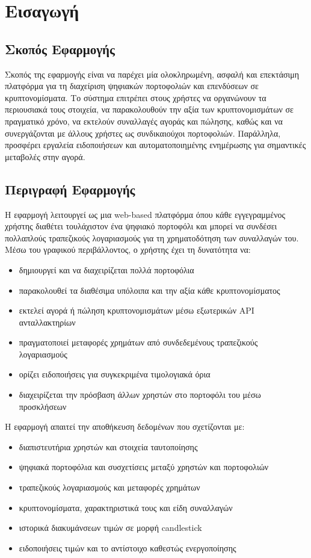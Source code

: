 \section{Εισαγωγή}

\subsection{Σκοπός Εφαρμογής}
Σκοπός της εφαρμογής είναι να παρέχει μία ολοκληρωμένη, ασφαλή και επεκτάσιμη πλατφόρμα για τη
διαχείριση ψηφιακών πορτοφολιών και επενδύσεων σε κρυπτονομίσματα. Το σύστημα επιτρέπει στους
χρήστες να οργανώνουν τα περιουσιακά τους στοιχεία, να παρακολουθούν την αξία των
κρυπτονομισμάτων σε πραγματικό χρόνο, να εκτελούν συναλλαγές αγοράς και πώλησης, καθώς και να
συνεργάζονται με άλλους χρήστες ως συνδικαιούχοι πορτοφολιών. Παράλληλα, προσφέρει εργαλεία
ειδοποιήσεων και αυτοματοποιημένης ενημέρωσης για σημαντικές μεταβολές στην αγορά.


\subsection{Περιγραφή Εφαρμογής}
Η εφαρμογή λειτουργεί ως μια web-based πλατφόρμα όπου κάθε εγγεγραμμένος χρήστης διαθέτει
τουλάχιστον ένα ψηφιακό πορτοφόλι και μπορεί να συνδέσει πολλαπλούς τραπεζικούς λογαριασμούς για
τη χρηματοδότηση των συναλλαγών του. Μέσω του γραφικού περιβάλλοντος, ο χρήστης έχει τη
δυνατότητα να:

\begin{itemize}
    \item δημιουργεί και να διαχειρίζεται πολλά πορτοφόλια
    \item παρακολουθεί τα διαθέσιμα υπόλοιπα και την αξία κάθε κρυπτονομίσματος
    \item εκτελεί αγορά ή πώληση κρυπτονομισμάτων μέσω εξωτερικών API ανταλλακτηρίων
    \item πραγματοποιεί μεταφορές χρημάτων από συνδεδεμένους τραπεζικούς λογαριασμούς
    \item ορίζει ειδοποιήσεις για συγκεκριμένα τιμολογιακά όρια
    \item διαχειρίζεται την πρόσβαση άλλων χρηστών στο πορτοφόλι του μέσω προσκλήσεων
\end{itemize}

Η εφαρμογή απαιτεί την αποθήκευση δεδομένων που σχετίζονται με:

\begin{itemize}
    \item διαπιστευτήρια χρηστών και στοιχεία ταυτοποίησης
    \item ψηφιακά πορτοφόλια και συσχετίσεις μεταξύ χρηστών και πορτοφολιών
    \item τραπεζικούς λογαριασμούς και μεταφορές χρημάτων
    \item κρυπτονομίσματα, χαρακτηριστικά τους και είδη συναλλαγών
    \item ιστορικά διακυμάνσεων τιμών σε μορφή candlestick
    \item ειδοποιήσεις τιμών και το αντίστοιχο καθεστώς ενεργοποίησης
\end{itemize}



